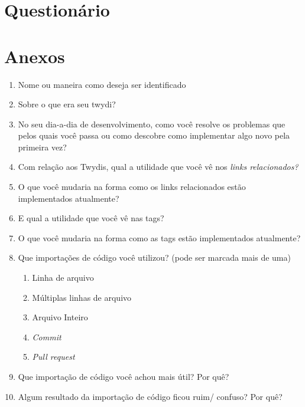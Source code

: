 \anexo
\chapter{Questionário}

\chapter{Anexos}

\begin{enumerate}
  \item Nome ou maneira como deseja ser identificado

  \item Sobre o que era seu twydi?

  \item No seu dia-a-dia de desenvolvimento, como você resolve os problemas que pelos quais você passa ou como descobre como implementar algo novo pela primeira vez?

  \item Com relação aos Twydis, qual a utilidade que você vê nos \textit{links relacionados?}

  \item O que você mudaria na forma como os links relacionados estão implementados atualmente?

  \item E qual a utilidade que você vê nas tags?

  \item O que você mudaria na forma como as tags estão implementados atualmente?

  \item Que importações de código você utilizou? (pode ser marcada mais de uma)
    \begin{enumerate}[i]
      \item Linha de arquivo
      \item Múltiplas linhas de arquivo
      \item Arquivo Inteiro
      \item \textit{Commit}
      \item \textit{Pull request}
    \end{enumerate}

  \item Que importação de código você achou mais útil? Por quê?

  \item Algum resultado da importação de código ficou ruim/ confuso? Por quê?


\end{enumerate}
